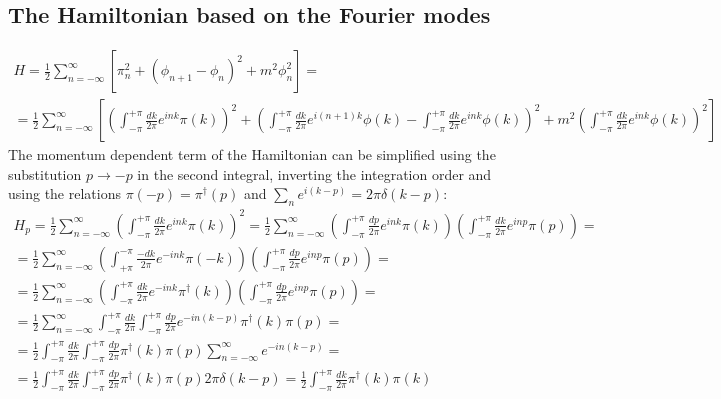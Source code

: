 \documentclass{article}
\begin{document}
\subsection{The Hamiltonian based on the Fourier modes}
\begin{equation}
\begin{gathered}
    H = \frac{1}{2} \sum_{n=-\infty}^{\infty}\left[\pi_n^2 + \left(\phi_{n+1} - \phi_n\right)^2 + m^2\phi_n^2\right] = \\
    = \frac{1}{2}
    \sum_{n=-\infty}^{\infty}\left[
        \left(\int_{-\pi}^{+\pi} \frac{dk}{2\pi}e^{ink}\pi(k)\right)^2 + \left(
            \int_{-\pi}^{+\pi} \frac{dk}{2\pi}e^{i(n + 1)k}\phi(k) -
            \int_{-\pi}^{+\pi} \frac{dk}{2\pi}e^{ink}\phi(k)
        \right)^2 + m^2\left(\int_{-\pi}^{+\pi} \frac{dk}{2\pi}e^{ink}\phi(k)\right)^2
    \right]
\end{gathered}
\end{equation}
The momentum dependent term of the Hamiltonian can be simplified using the substitution $p \rightarrow -p$ in the second integral, inverting the integration order and using the relations $\pi(-p) = \pi^\dagger(p)$ and $\sum_n e^{i(k-p)} = 2\pi\delta(k-p)$:
\begin{equation}
\begin{gathered}
    H_p = \frac{1}{2}
    \sum_{n=-\infty}^{\infty}
        \left(\int_{-\pi}^{+\pi} \frac{dk}{2\pi}e^{ink}\pi(k)\right)^2
    = \frac{1}{2}
    \sum_{n=-\infty}^{\infty} 
        \left(\int_{-\pi}^{+\pi} \frac{dp}{2\pi}e^{ink}\pi(k)\right)
        \left(\int_{-\pi}^{+\pi} \frac{dk}{2\pi}e^{inp}\pi(p)\right) = \\
    = \frac{1}{2}
    \sum_{n=-\infty}^{\infty}
        \left(\int_{+\pi}^{-\pi} \frac{-dk}{2\pi}e^{-ink}\pi(-k)\right) 
        \left(\int_{-\pi}^{+\pi} \frac{dp}{2\pi}e^{inp}\pi(p)\right) = \\
    = \frac{1}{2}
    \sum_{n=-\infty}^{\infty}
        \left(\int_{-\pi}^{+\pi} \frac{dk}{2\pi}e^{-ink}\pi^\dagger(k)\right) 
        \left(\int_{-\pi}^{+\pi} \frac{dp}{2\pi}e^{inp}\pi(p)\right) = \\
    = \frac{1}{2}
    \sum_{n=-\infty}^{\infty}
    \int_{-\pi}^{+\pi} \frac{dk}{2\pi}
    \int_{-\pi}^{+\pi} \frac{dp}{2\pi}
    e^{-in(k - p)}\pi^\dagger(k)\pi(p) = \\
    = \frac{1}{2}
    \int_{-\pi}^{+\pi} \frac{dk}{2\pi}
    \int_{-\pi}^{+\pi} \frac{dp}{2\pi}
    \pi^\dagger(k)\pi(p)
    \sum_{n=-\infty}^{\infty}e^{-in(k - p)} = \\
    = \frac{1}{2}
    \int_{-\pi}^{+\pi} \frac{dk}{2\pi}
    \int_{-\pi}^{+\pi} \frac{dp}{2\pi}
    \pi^\dagger(k)\pi(p) 2\pi \delta(k-p)
    = \frac{1}{2}
    \int_{-\pi}^{+\pi} \frac{dk}{2\pi}
    \pi^\dagger(k)\pi(k)
\end{gathered}
\end{equation}
\end{document}
